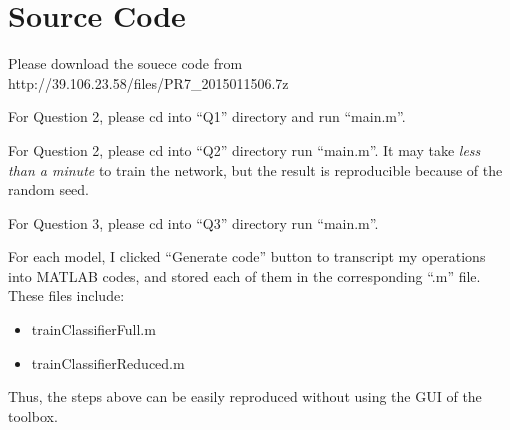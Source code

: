 \documentclass{article}
\begin{document}
\section*{Source Code}
{
    Please download the souece code from http://39.106.23.58/files/PR7\_2015011506.7z

    For Question 2, please cd into ``Q1'' directory and run ``main.m''. 

    For Question 2, please cd into ``Q2'' directory run ``main.m''. It may take \emph{less than a minute} to train the network, but the result is reproducible because of the random seed.

    For Question 3, please cd into ``Q3'' directory run ``main.m''.

    For each model, I clicked ``Generate code'' button to transcript my operations into MATLAB codes, and stored each of them in the corresponding ``.m'' file. These files include:
    \begin{itemize}
        \item trainClassifierFull.m
        \item trainClassifierReduced.m
    \end{itemize}
    Thus, the steps above can be easily reproduced without using the GUI of the toolbox. 

}

\clearpage
\end{document}
